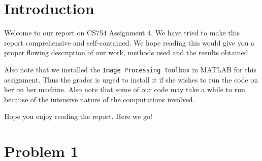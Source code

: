 \documentclass[a4paper,14pt]{article}
\numberwithin{definition}{section}
\numberwithin{mytheorem}{subsection}
\begin{document}

\date{Spring 2022}
\maketitle

\justifying
\tableofcontents

\newpage
\justifying
\section*{Introduction}

Welcome  to our report on CS754 Assignment 4. We have tried to make this report comprehensive and self-contained. We hope reading this would give you a proper flowing description of our work, methods used and the results obtained.

Also note that we installed the \texttt{Image Processing Toolbox} in MATLAB for this assignment. Thus the grader is urged to install it if she wishes to run the code on her on her machine. Also note that some of our code may take a while to run because of the intensive nature of the computations involved.

Hope you enjoy reading the report. Here we go!
\section{Problem 1}
\end{document}
